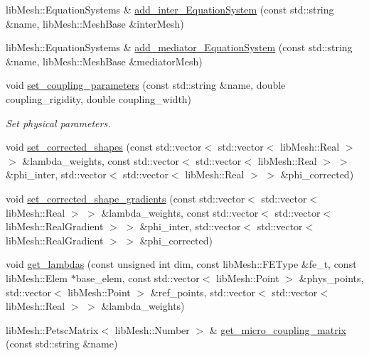 \begin{DoxyCompactItemize}
\item 
lib\+Mesh\+::\+Equation\+Systems \& \hyperlink{classcarl_1_1assemble__coupling__matrices_a837d8dd37af967adb11fd969660aff92}{add\+\_\+inter\+\_\+\+Equation\+System} (const std\+::string \&name, lib\+Mesh\+::\+Mesh\+Base \&inter\+Mesh)
\item 
lib\+Mesh\+::\+Equation\+Systems \& \hyperlink{classcarl_1_1assemble__coupling__matrices_a48de3bdb72c2b94ef7667b9288487d1b}{add\+\_\+mediator\+\_\+\+Equation\+System} (const std\+::string \&name, lib\+Mesh\+::\+Mesh\+Base \&mediator\+Mesh)
\item 
void \hyperlink{classcarl_1_1assemble__coupling__matrices_a68f48738c5ee19dc3b23f7c7b5645f84}{set\+\_\+coupling\+\_\+parameters} (const std\+::string \&name, double coupling\+\_\+rigidity, double coupling\+\_\+width)
\begin{DoxyCompactList}\small\item\em Set physical parameters. \end{DoxyCompactList}\item 
void \hyperlink{classcarl_1_1assemble__coupling__matrices_a677a3527845b3503cc5f5daa8de63864}{set\+\_\+corrected\+\_\+shapes} (const std\+::vector$<$ std\+::vector$<$ lib\+Mesh\+::\+Real $>$ $>$ \&lambda\+\_\+weights, const std\+::vector$<$ std\+::vector$<$ lib\+Mesh\+::\+Real $>$ $>$ \&phi\+\_\+inter, std\+::vector$<$ std\+::vector$<$ lib\+Mesh\+::\+Real $>$ $>$ \&phi\+\_\+corrected)
\item 
void \hyperlink{classcarl_1_1assemble__coupling__matrices_a7f5ae4da1fe905fb90e9016f1dbb2fea}{set\+\_\+corrected\+\_\+shape\+\_\+gradients} (const std\+::vector$<$ std\+::vector$<$ lib\+Mesh\+::\+Real $>$ $>$ \&lambda\+\_\+weights, const std\+::vector$<$ std\+::vector$<$ lib\+Mesh\+::\+Real\+Gradient $>$ $>$ \&phi\+\_\+inter, std\+::vector$<$ std\+::vector$<$ lib\+Mesh\+::\+Real\+Gradient $>$ $>$ \&phi\+\_\+corrected)
\item 
void \hyperlink{classcarl_1_1assemble__coupling__matrices_a27ee998dbd1a87b1ce4d1e9c9e515e43}{get\+\_\+lambdas} (const unsigned int dim, const lib\+Mesh\+::\+F\+E\+Type \&fe\+\_\+t, const lib\+Mesh\+::\+Elem $\ast$base\+\_\+elem, const std\+::vector$<$ lib\+Mesh\+::\+Point $>$ \&phys\+\_\+points, std\+::vector$<$ lib\+Mesh\+::\+Point $>$ \&ref\+\_\+points, std\+::vector$<$ std\+::vector$<$ lib\+Mesh\+::\+Real $>$ $>$ \&lambda\+\_\+weights)
\item 
lib\+Mesh\+::\+Petsc\+Matrix$<$ lib\+Mesh\+::\+Number $>$ \& \hyperlink{classcarl_1_1assemble__coupling__matrices_aaffaa004d87b534c3122f8bdc82820a1}{get\+\_\+micro\+\_\+coupling\+\_\+matrix} (const std\+::string \&name)

\end{DoxyCompactItemize}
